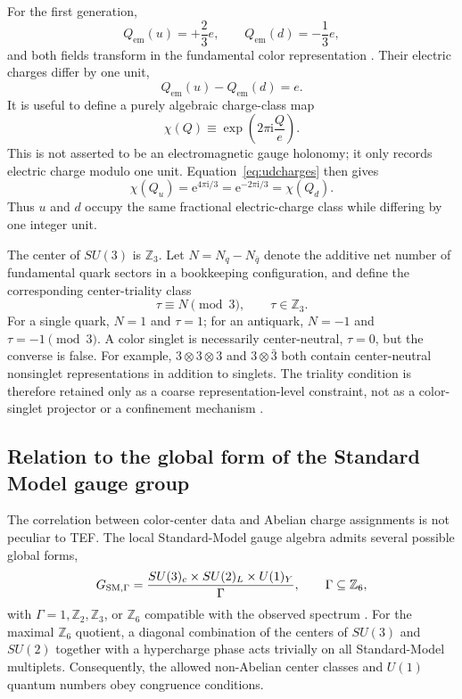 \documentclass[aps,prd,reprint,superscriptaddress,nofootinbib,longbibliography,floatfix]{revtex4-2}
\newcommand{\ee}{\mathrm{e}}
\newcommand{\ii}{\mathrm{i}}
\newcommand{\Qem}{Q_{\mathrm{em}}}
\begin{document}
For the first generation,
\begin{equation}
\Qem(u)=+\frac23e,
\qquad
\Qem(d)=-\frac13e,
\label{eq:udcharges}
\end{equation}
and both fields transform in the fundamental color representation \cite{PDG2026}. Their electric charges differ by one unit,
\begin{equation}
\Qem(u)-\Qem(d)=e.
\label{eq:chargedifference}
\end{equation}
It is useful to define a purely algebraic charge-class map
\begin{equation}
\chi(Q)\equiv\exp\!\left(2\pi\ii\frac{Q}{e}\right).
\label{eq:chargemap}
\end{equation}
This is not asserted to be an electromagnetic gauge holonomy; it only records electric charge modulo one unit. Equation~\eqref{eq:udcharges} then gives
\begin{equation}
\chi(Q_u)=\ee^{4\pi\ii/3}
=\ee^{-2\pi\ii/3}
=\chi(Q_d).
\label{eq:sameclass}
\end{equation}
Thus $u$ and $d$ occupy the same fractional electric-charge class while differing by one integer unit.

The center of $SU(3)$ is $\mathbb Z_3$. Let $N=N_q-N_{\bar q}$ denote the additive net number of fundamental quark sectors in a bookkeeping configuration, and define the corresponding center-triality class
\begin{equation}
\tau\equiv N\pmod3,
\qquad \tau\in\mathbb Z_3.
\label{eq:taudef}
\end{equation}
For a single quark, $N=1$ and $\tau=1$; for an antiquark, $N=-1$ and $\tau=-1\pmod3$. A color singlet is necessarily center-neutral, $\tau=0$, but the converse is false. For example, $3\otimes3\otimes3$ and $3\otimes\bar3$ both contain center-neutral nonsinglet representations in addition to singlets. The triality condition is therefore retained only as a coarse representation-level constraint, not as a color-singlet projector or a confinement mechanism \cite{PDG2026,Ghanbarpour2022}.

\subsection{Relation to the global form of the Standard Model gauge group}
\label{sec:globalSM}

The correlation between color-center data and Abelian charge assignments is not peculiar to TEF. The local Standard-Model gauge algebra admits several possible global forms,
\begin{equation}
G_{\rm SM,\Gamma}=
\frac{SU(3)_c\times SU(2)_L\times U(1)_Y}{\Gamma},
\qquad
\Gamma\subseteq\mathbb Z_6,
\label{eq:gsmglobal}
\end{equation}
with $\Gamma=1,\mathbb Z_2,\mathbb Z_3$, or $\mathbb Z_6$ compatible with the observed spectrum \cite{Tong2017,HsinGomis2024}. For the maximal $\mathbb Z_6$ quotient, a diagonal combination of the centers of $SU(3)$ and $SU(2)$ together with a hypercharge phase acts trivially on all Standard-Model multiplets. Consequently, the allowed non-Abelian center classes and $U(1)$ quantum numbers obey congruence conditions.
\end{document}
